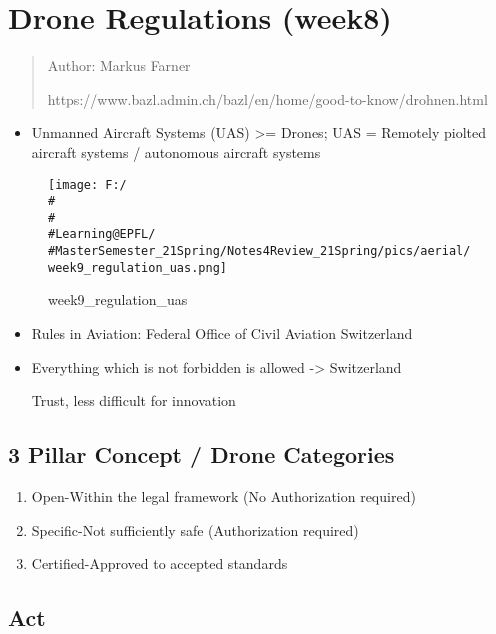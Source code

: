 \documentclass[]{article}
\begin{document}
\section{Drone Regulations (week8)}\label{header-n1715}

\begin{quote}
Author: Markus Farner

https://www.bazl.admin.ch/bazl/en/home/good-to-know/drohnen.html
\end{quote}

\begin{itemize}
\item
  Unmanned Aircraft Systems (UAS) \textgreater{}= Drones; UAS = Remotely
  piolted aircraft systems / autonomous aircraft systems
\end{itemize}

\begin{figure}
\centering
\texttt{[image: F:/\\\#\\\#\\\#Learning@EPFL/\\\#MasterSemester\_21Spring/Notes4Review\_21Spring/pics/aerial/week9\_regulation\_uas.png]}
\caption{week9\_regulation\_uas}
\end{figure}

\begin{itemize}
\item
  Rules in Aviation: Federal Office of Civil Aviation Switzerland
\item
  Everything which is not forbidden is allowed -\textgreater{}
  Switzerland

  Trust, less difficult for innovation
\end{itemize}

\subsection{3 Pillar Concept / Drone Categories}\label{header-n1729}

\begin{enumerate}
\def\labelenumi{\arabic{enumi}.}
\item
  Open-Within the legal framework (No Authorization required)
\item
  Specific-Not sufficiently safe (Authorization required)
\item
  Certified-Approved to accepted standards
\end{enumerate}

\subsection{Act}\label{header-n1737}
\end{document}
